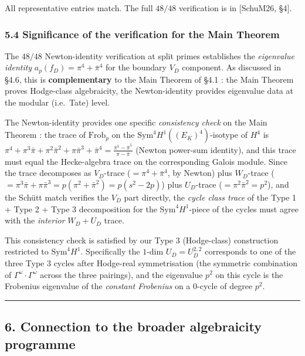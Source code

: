 \documentclass[
  11pt,
  a4paper,
]{amsart}
\begin{document}
All representative entries match. The full \(48 / 48\) verification is in {[}SchuM26, §4{]}.

\hypertarget{significance-of-the-verification-for-the-main-theorem}{%
\subsubsection{5.4 Significance of the verification for the Main Theorem}\label{significance-of-the-verification-for-the-main-theorem}}

The \(48 / 48\) Newton-identity verification at split primes establishes the \emph{eigenvalue identity} \(a_p(f_D) = \pi^4 + \bar\pi^4\) for the boundary \(V_D\) component. As discussed in §4.6, this is \textbf{complementary} to the Main Theorem of §4.1 : the Main Theorem proves Hodge-class algebraicity, the Newton-identity provides eigenvalue data at the modular (i.e.~Tate) level.

The Newton-identity provides one specific \emph{consistency check} on the Main Theorem : the trace of \(\mathrm{Frob}_p\) on the \(\mathrm{Sym}^4 H^1((E_K)^4)\)-isotype of \(H^4\) is \(\pi^4 + \pi^3\bar\pi + \pi^2\bar\pi^2 + \pi\bar\pi^3 + \bar\pi^4 = \frac{\pi^5 - \bar\pi^5}{\pi - \bar\pi}\) (Newton power-sum identity), and this trace must equal the Hecke-algebra trace on the corresponding Galois module. Since the trace decomposes as \(V_D\)-trace (\(= \pi^4 + \bar\pi^4\), by Newton) plus \(W_D\)-trace (\(= \pi^3\bar\pi + \pi\bar\pi^3 = p(\pi^2 + \bar\pi^2) = p(s^2 - 2p)\)) plus \(U_D\)-trace (\(= \pi^2\bar\pi^2 = p^2\)), and the Schütt match verifies the \(V_D\) part directly, the \emph{cycle class trace} of the Type 1 + Type 2 + Type 3 decomposition for the \(\mathrm{Sym}^4 H^1\)-piece of the cycles must agree with the \emph{interior} \(W_D + U_D\) trace.

This consistency check is satisfied by our Type 3 (Hodge-class) construction restricted to \(\mathrm{Sym}^4 H^1\). Specifically the \(1\)-dim \(U_D = U_D^{2,2}\) corresponds to one of the three Type 3 cycles after Hodge-real symmetrisation (the symmetric combination of \(\Gamma^\omega \cdot \Gamma^{\bar\omega}\) across the three pairings), and the eigenvalue \(p^2\) on this cycle is the Frobenius eigenvalue of the \emph{constant Frobenius} on a \(0\)-cycle of degree \(p^2\).

\begin{center}\rule{0.5\linewidth}{0.5pt}\end{center}

\hypertarget{connection-to-the-broader-algebraicity-programme}{%
\subsection{6. Connection to the broader algebraicity programme}\label{connection-to-the-broader-algebraicity-programme}}
\end{document}
